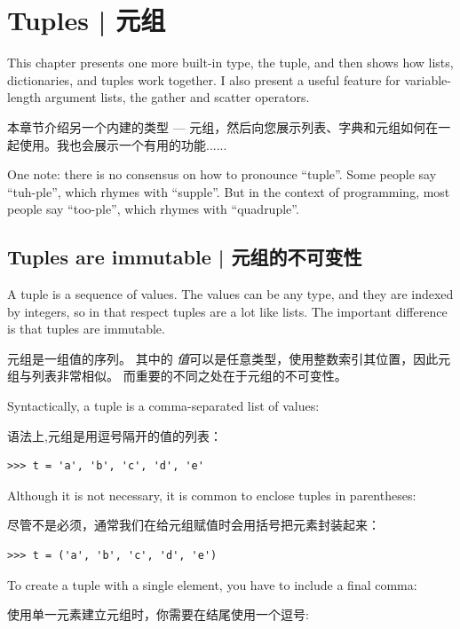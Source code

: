 \chapter{Tuples | 元组}
\label{tuplechap}

This chapter presents one more built-in type, the tuple, and then
shows how lists, dictionaries, and tuples work together.
I also present a useful feature for variable-length argument lists,
the gather and scatter operators.

本章节介绍另一个内建的类型 --- 元组，然后向您展示列表、字典和元组如何在一起使用。我也会展示一个有用的功能......

One note: there is no consensus on how to pronounce ``tuple''.
Some people say ``tuh-ple'', which rhymes with ``supple''.  But
in the context of programming, most people say ``too-ple'', which
rhymes with ``quadruple''.


\section{Tuples are immutable | 元组的不可变性}

A tuple is a sequence of values.  The values can be any type, and
they are indexed by integers, so in that respect tuples are a lot
like lists.  The important difference is that tuples are immutable.

元组是一组值的序列。  其中的 \emph{值}可以是任意类型，使用整数索引其位置，因此元组与列表非常相似。  而重要的不同之处在于元组的不可变性。

Syntactically, a tuple is a comma-separated list of values:

语法上,元组是用逗号隔开的值的列表：

\begin{lstlisting}
>>> t = 'a', 'b', 'c', 'd', 'e'
\end{lstlisting}
%
Although it is not necessary, it is common to enclose tuples in
parentheses:

尽管不是必须，通常我们在给元组赋值时会用括号把元素封装起来：


\begin{lstlisting}
>>> t = ('a', 'b', 'c', 'd', 'e')
\end{lstlisting}
%
To create a tuple with a single element, you have to include a final
comma:

使用单一元素建立元组时，你需要在结尾使用一个逗号:

